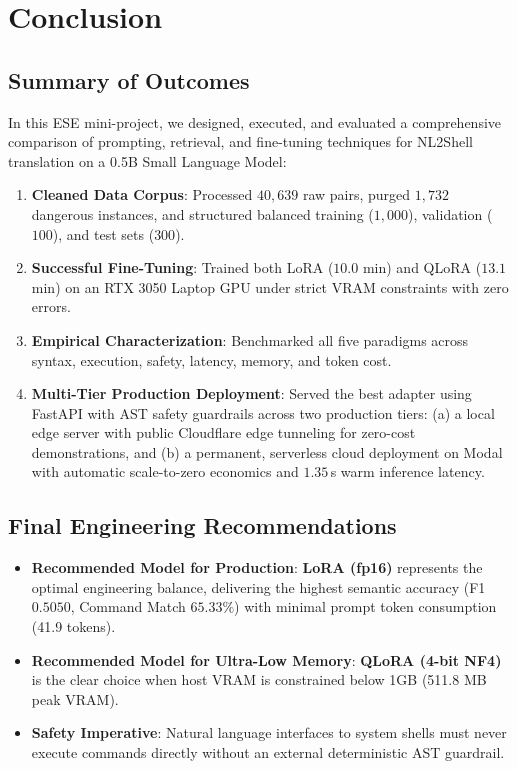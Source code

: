 \documentclass[11pt,a4paper]{report}
\begin{document}
\chapter{Conclusion}

\section{Summary of Outcomes}
In this ESE mini-project, we designed, executed, and evaluated a comprehensive comparison of prompting, retrieval, and fine-tuning techniques for NL2Shell translation on a 0.5B Small Language Model:
\begin{enumerate}
    \item \textbf{Cleaned Data Corpus}: Processed $40,639$ raw pairs, purged $1,732$ dangerous instances, and structured balanced training ($1,000$), validation ($100$), and test sets ($300$).
    \item \textbf{Successful Fine-Tuning}: Trained both LoRA ($10.0$ min) and QLoRA ($13.1$ min) on an RTX 3050 Laptop GPU under strict VRAM constraints with zero errors.
    \item \textbf{Empirical Characterization}: Benchmarked all five paradigms across syntax, execution, safety, latency, memory, and token cost.
    \item \textbf{Multi-Tier Production Deployment}: Served the best adapter using FastAPI with AST safety guardrails across two production tiers: (a) a local edge server with public Cloudflare edge tunneling for zero-cost demonstrations, and (b) a permanent, serverless cloud deployment on Modal with automatic scale-to-zero economics and $1.35$\,s warm inference latency.
\end{enumerate}

\section{Final Engineering Recommendations}
\begin{itemize}
    \item \textbf{Recommended Model for Production}: \textbf{LoRA (fp16)} represents the optimal engineering balance, delivering the highest semantic accuracy (F1 $0.5050$, Command Match $65.33\%$) with minimal prompt token consumption (41.9 tokens).
    \item \textbf{Recommended Model for Ultra-Low Memory}: \textbf{QLoRA (4-bit NF4)} is the clear choice when host VRAM is constrained below 1GB (511.8 MB peak VRAM).
    \item \textbf{Safety Imperative}: Natural language interfaces to system shells must never execute commands directly without an external deterministic AST guardrail.
\end{itemize}
\end{document}
